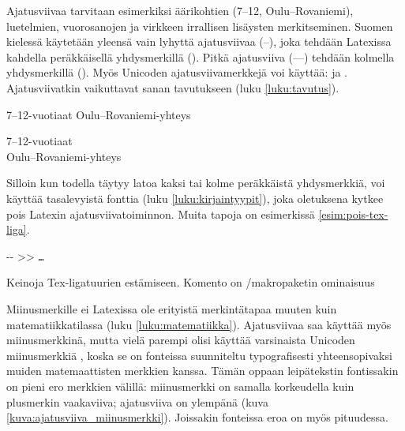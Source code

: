 Ajatusviivaa tarvitaan esimerkiksi äärikohtien (7--12,
Oulu--Rova\-niemi), luetelmien, vuorosanojen ja virkkeen irrallisen
lisäysten merkitseminen. Suomen kielessä käytetään yleensä vain lyhyttä
ajatusviivaa \mbox{(--)}, joka tehdään Latexissa kahdella peräkkäisellä
yhdysmerkillä \mbox{(\koodi{--})}. Pitkä ajatusviiva \mbox{(---)}
tehdään kolmella yhdysmerkillä \mbox{(\koodi{---})}. Myös Unicoden
ajatusviivamerkkejä voi käyttää:  ja
. Ajatusviivatkin vaikuttavat sanan tavutukseen
(luku \ref{luku:tavutus}).

\begin{koodilohkosis}
  7--12-vuotiaat
  Oulu--Rovaniemi-yhteys
\end{koodilohkosis}

\begin{tulossis}
  7--12-vuotiaat \\
  Oulu--Rovaniemi-yhteys
\end{tulossis}

Silloin kun todella täytyy latoa kaksi tai kolme peräkkäistä
yhdysmerkkiä, voi käyttää tasalevyistä fonttia (luku
\ref{luku:kirjaintyypit}), joka oletuksena kytkee pois Latexin
ajatusviivatoiminnon. Muita tapoja on esimerkissä
\ref{esim:pois-tex-liga}.

\begin{esimerkki}
\begin{koodilohko}
  -\mbox{}-  %
  >\mbox{}>  %
  \texttt{…} %
\end{koodilohko}
\caption{Keinoja Tex-ligatuurien estämiseen. Komento  on \-/makropaketin ominaisuus}
\label{esim:pois-tex-liga}
\end{esimerkki}

Miinusmerkille ei Latexissa ole erityistä merkintätapaa muuten kuin
matematiikkatilassa (luku \ref{luku:matematiikka}). Ajatusviivaa saa
käyttää myös miinusmerkkinä, mutta vielä parempi olisi käyttää
varsinaista Unicoden miinusmerkkiä , koska
se on fonteissa suunniteltu typografisesti yhteensopivaksi muiden
matemaattisten merkkien kanssa. Tämän oppaan leipätekstin fontissakin on
pieni ero merkkien välillä: miinusmerkki on samalla korkeudella kuin
plusmerkin vaakaviiva; ajatusviiva on ylempänä (kuva
\ref{kuva:ajatusviiva_miinusmerkki}). Joissakin fonteissa eroa on myös
pituudessa.

